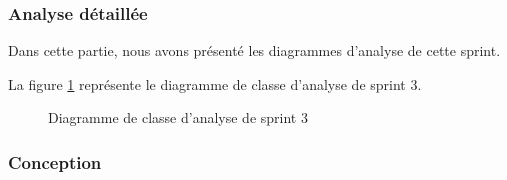 \subsubsection{Analyse détaillée}
Dans cette partie, nous avons présenté les diagrammes d'analyse de cette sprint.

La figure \ref{fig:class_analyse_signatures3} représente le diagramme de classe d'analyse de sprint 3.
\begin{figure}[H]
  \centering
  \caption{Diagramme de classe d'analyse de sprint 3}
  \label{fig:class_analyse_signatures3}
\end{figure}


\subsubsection{Conception}

